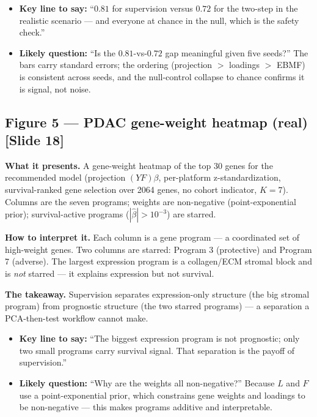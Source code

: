 \documentclass[11pt]{article}
\newcommand{\sectionlabel}[1]{\textbf{#1}}
\begin{document}
\begin{itemize}
\item \sectionlabel{Key line to say:} ``$0.81$ for supervision versus $0.72$ for the two-step in the
realistic scenario --- and everyone at chance in the null, which is the safety check.''
\item \sectionlabel{Likely question:} ``Is the $0.81$-vs-$0.72$ gap meaningful given five seeds?''
The bars carry standard errors; the ordering (projection $>$ loadings $>$ EBMF) is consistent across
seeds, and the null-control collapse to chance confirms it is signal, not noise.
\end{itemize}

\subsection*{Figure 5 --- PDAC gene-weight heatmap (real) [Slide 18]}
\sectionlabel{What it presents.} A gene-weight heatmap of the top 30 genes for the recommended model
(projection $(YF)\beta$, per-platform z-standardization, survival-ranked gene selection over 2064
genes, no cohort indicator, $K = 7$). Columns are the seven programs; weights are non-negative
(point-exponential prior); survival-active programs ($|\hat\beta| > 10^{-3}$) are starred.

\sectionlabel{How to interpret it.} Each column is a gene program --- a coordinated set of
high-weight genes. Two columns are starred: Program 3 (protective) and Program 7 (adverse). The
largest expression program is a collagen/ECM stromal block and is \emph{not} starred --- it explains
expression but not survival.

\sectionlabel{The takeaway.} Supervision separates expression-only structure (the big stromal
program) from prognostic structure (the two starred programs) --- a separation a PCA-then-test
workflow cannot make.

\begin{itemize}
\item \sectionlabel{Key line to say:} ``The biggest expression program is not prognostic; only two
small programs carry survival signal. That separation is the payoff of supervision.''
\item \sectionlabel{Likely question:} ``Why are the weights all non-negative?'' Because $L$ and $F$
use a point-exponential prior, which constrains gene weights and loadings to be non-negative --- this
makes programs additive and interpretable.
\end{itemize}
\end{document}
